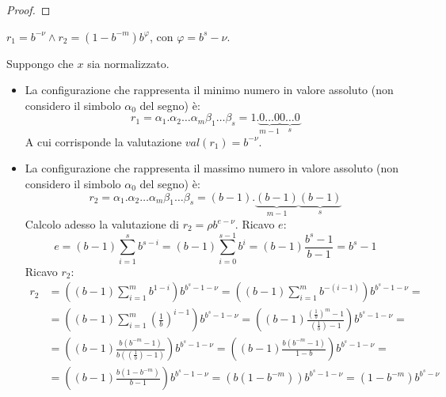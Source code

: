 \begin{proof}
\end{proof}

\begin{exercise}[1.6]
$r_{1} = b^{-\nu} \wedge r_{2} = (1 - b^{-m})b^{\varphi}$, con $\varphi = b^{s} - \nu$.
\end{exercise}
Suppongo che $x$ sia normalizzato.
\begin{itemize}
\item La configurazione che rappresenta il minimo
numero in valore assoluto (non considero il simbolo $\alpha_{0}$ del segno) \`e:
\begin{displaymath}
	r_{1} = \alpha_{1}.\alpha_{2} \ldots \alpha_{m} \beta_{1} \ldots \beta_{s} = 
		1.\underbrace{0 \ldots 0}_{m - 1} \underbrace{0 \ldots 0}_{s}
\end{displaymath}
A cui corrisponde la valutazione $val(r_{1}) = b^{-\nu}$.

\item La configurazione che rappresenta il massimo numero in valore assoluto
(non considero il simbolo $\alpha_{0}$ del segno) \`e:
\begin{displaymath}
	r_{2} = \alpha_{1}.\alpha_{2} \ldots \alpha_{m} \beta_{1} \ldots \beta_{s} =
		(b - 1).\underbrace{(b - 1)}_{m - 1}\underbrace{(b - 1)}_{s}
\end{displaymath}
Calcolo adesso la valutazione di $r_{2} = \rho b^{e - \nu}$. Ricavo $e$:
\begin{displaymath}
		e = (b-1)\sum_{i = 1}^{s}{b^{s-i}} = (b-1)\sum_{i = 0}^{s-1}{b^{i}} =
			 (b-1)\frac{b^{s}-1}{b-1} = b^{s}-1
\end{displaymath}
Ricavo $r_{2}$:
\begin{displaymath}
	\begin{split}
		r_{2} 	&= \left ( (b-1)\sum_{i = 1}^{m}{b^{1 - i}} \right)b^{b^{s}-1-\nu} = 
 			\left ( (b-1)\sum_{i = 1}^{m}{b^{-(i - 1)}} \right)b^{b^{s}-1-\nu} = \\
	 			&= \left ( (b-1)\sum_{i = 1}^{m}{\left ( \frac{1}{b} \right ) ^{i - 1}} 
					\right)b^{b^{s}-1-\nu} = 
					\left ( (b-1)\frac{\left ( \frac{1}{b} \right ) ^{m} - 1}{
						\left ( \frac{1}{b} \right ) - 1}
					\right)b^{b^{s}-1-\nu} = \\
				&= \left ( (b-1) \frac{b \left( b^{-m} - 1 \right )}{
						b \left ( \left ( \frac{1}{b} \right ) - 1 \right ) }
					\right)b^{b^{s}-1-\nu} = 
					\left ( (b-1) \frac{b \left( b^{-m} - 1 \right )}{1 - b} 
						\right)b^{b^{s}-1-\nu} = \\
				&= \left ( (b-1) \frac{b \left( 1 - b^{-m} \right )}{b - 1} 
					\right)b^{b^{s}-1-\nu} = 
					\left ( b \left( 1 - b^{-m} \right ) \right)b^{b^{s}-1-\nu} = 
					\left( 1 - b^{-m} \right ) b^{b^{s} - \nu}
	\end{split}
\end{displaymath}
\end{itemize}

